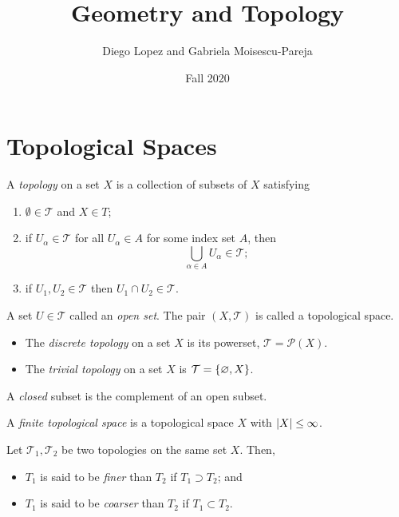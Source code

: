 \documentclass[12pt]{book} %
\title{Geometry and Topology}
\author{Diego Lopez and Gabriela Moisescu-Pareja}
\date{Fall 2020}
\newcommand{\T}{\mathcal T}
\begin{document}
\maketitle

\chapter{Topological Spaces}

\begin{definition}
A \emph{topology} on a set \( X \) is a collection of subsets of \( X \) satisfying
\begin{enumerate}
\item \( \emptyset \in \T \) and \( X \in T \);
\item if \( U_\alpha \in \T \) for all \( U_\alpha \in A \) for some index set \( A \), then \[ \bigcup_{\alpha \in A} U_\alpha \in \T; \]
\item if \( U_1, U_2 \in \T \) then \( U_1 \cap U_2 \in \T \).
\end{enumerate}
A set \( U \in \T \) called an \emph{open set}.
The pair \( (X, \T) \) is called a topological space.
\end{definition}

\begin{example} \skipline
\begin{itemize}
\item The \emph{discrete topology} on a set \( X \) is its powerset, \ie \( \T = \mathcal P(X) \).
\item The \emph{trivial topology} on a set \( X \) is \( \T = \set{\emptyset, X} \).
\end{itemize}
\end{example}

\begin{definition}
A \emph{closed} subset is the complement of an open subset.
\end{definition}

\begin{definition}
A \emph{finite topological space} is a topological space \( X \) with \( \lvert X\rvert \leq \infty \).
\end{definition}

\begin{definition}
Let \( \T_1, \T_2 \) be two topologies on the same set \( X \).
Then, 
\begin{itemize}
\item \( T_1 \) is said to be \emph{finer} than \( T_2 \) if \( T_1 \supset T_2 \); and
\item \( T_1 \) is said to be \emph{coarser} than \( T_2 \) if \( T_1 \subset T_2 \).
\end{itemize}
\end{definition}
\end{document}
